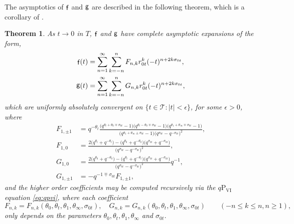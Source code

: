 \documentclass[a4paper,reqno,11pt]{amsart}
\numberwithin{equation}{section}
\numberwithin{figure}{section}
\theoremstyle{plain}
\newtheorem{theorem}{Theorem}[section]
\theoremstyle{remark}
\DeclareMathOperator{\sff}{{\sf f}}
\DeclareMathOperator{\sfg}{{\sf g}}
\newcommand\Psix{\textrm{P}_{\textrm{VI}}}
\numberwithin{rhp}{section}
\begin{document}
The asymptotics of $\sff$ and $\sfg$ are described in the following theorem, which is a corollary of \cite[Thm. 2.14]{roffelsen2024segre}.
\begin{theorem} \label{thm:asymptotic}
As $t\rightarrow 0$ in $T$, $\sff$ and $\sfg$ have complete asymptotic expansions of the form,
\begin{align*}
    \sff(t)&=\sum_{n=1}^\infty\sum_{k=-n}^n F_{n,k}r_{0t}^k(- t)^{n+2k\sigma_{0t}},\\
    \sfg(t)&=\sum_{n=1}^\infty\sum_{k=-n}^n G_{n,k}r_{0t}^k(- t)^{n+2k\sigma_{0t}},
\end{align*}
which are uniformly absolutely convergent on $\{t\in \mathcal{T}:|t|<\epsilon\}$, for some $\epsilon>0$, where
\begin{align*}
    F_{1,\pm 1}&=q^{-\theta_t}\frac{\bigl(q^{\theta_t+\theta_0\mp\sigma_{0t}}-1\bigr)\bigl(q^{\theta_t-\theta_0\mp\sigma_{0t}}-1\bigr)\bigl(q^{\theta_1+\theta_\infty\mp\sigma_{0t}}-1\bigr)}{\bigl(q^{\theta_1+\theta_\infty\pm \sigma_{0t}}-1\bigr)\bigl(q^{\sigma_{0t}}-q^{-\sigma_{0t}}\bigr)^2},\\
    F_{1,0}&=\frac{2\bigl(q^{\theta_t}+q^{-\theta_t}\bigr)-\bigl(q^{\theta_0}+q^{-\theta_0}\bigr)\bigl(q^{ \sigma_{0t}}+q^{- \sigma_{0t}}\bigr)}{\bigl(q^{ \sigma_{0t}}-q^{- \sigma_{0t}}\bigr)^2},\\
    G_{1,0}&=\frac{2\bigl(q^{ \theta_0}+q^{- \theta_0}\bigr)-\bigl(q^{ \theta_t}+q^{- \theta_t}\bigr)\bigl(q^{ \sigma_{0t}}+q^{- \sigma_{0t}}\bigr)}{\bigl(q^{ \sigma_{0t}}-q^{- \sigma_{0t}}\bigr)^2}q^{-1},\\
    G_{1,\pm 1}&=-q^{-1\mp\sigma_{0t}}F_{1,\pm 1},
\end{align*}
and the higher order coefficients may be computed recursively via the $q\Psix$ equation \eqref{eq:qpvi}, where each coefficient
\begin{equation*}
    F_{n,k}=F_{n,k}(\theta_0,\theta_t,\theta_1,\theta_\infty,\sigma_{0t}),\quad
    G_{n,k}=G_{n,k}(\theta_0,\theta_t,\theta_1,\theta_\infty,\sigma_{0t})\qquad (-n\leq k \leq n, n\geq 1),
\end{equation*}
only depends on the parameters $\theta_0,\theta_t,\theta_1,\theta_\infty$ and $\sigma_{0t}$.
\end{theorem}
\end{document}
